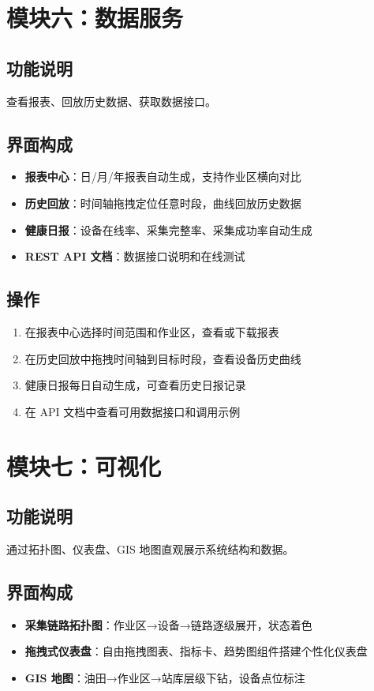 \documentclass[11pt,a4paper]{ctexart}
\begin{document}
\section{模块六：数据服务}

\subsection{功能说明}
查看报表、回放历史数据、获取数据接口。

\subsection{界面构成}
\begin{itemize}[leftmargin=*]
  \item \textbf{报表中心}：日/月/年报表自动生成，支持作业区横向对比
  \item \textbf{历史回放}：时间轴拖拽定位任意时段，曲线回放历史数据
  \item \textbf{健康日报}：设备在线率、采集完整率、采集成功率自动生成
  \item \textbf{REST API 文档}：数据接口说明和在线测试
\end{itemize}

\subsection{操作}
\begin{enumerate}[leftmargin=*]
  \item 在报表中心选择时间范围和作业区，查看或下载报表
  \item 在历史回放中拖拽时间轴到目标时段，查看设备历史曲线
  \item 健康日报每日自动生成，可查看历史日报记录
  \item 在 API 文档中查看可用数据接口和调用示例
\end{enumerate}

\section{模块七：可视化}

\subsection{功能说明}
通过拓扑图、仪表盘、GIS 地图直观展示系统结构和数据。

\subsection{界面构成}
\begin{itemize}[leftmargin=*]
  \item \textbf{采集链路拓扑图}：作业区→设备→链路逐级展开，状态着色
  \item \textbf{拖拽式仪表盘}：自由拖拽图表、指标卡、趋势图组件搭建个性化仪表盘
  \item \textbf{GIS 地图}：油田→作业区→站库层级下钻，设备点位标注
\end{itemize}
\end{document}
